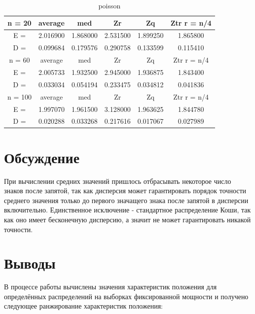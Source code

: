 \documentclass[12pt]{report}
\begin{document}
\begin{table}[H]
\caption{poisson}
\label{tab:my_label5}
\begin{center}
\vspace{5mm}
\begin{tabular}{|c|c|c|c|c|c|}
\hline
n = 20    &average     &med         &Zr          &Zq          &Ztr r = n/4 \\
\hline
E =       &2.016900    &1.868000    &2.531500    &1.899250    &1.865800    \\
\hline
D =       &0.099684    &0.179576    &0.290758    &0.133599    &0.115410    \\
\hline
n = 60    &average     &med         &Zr          &Zq          &Ztr r = n/4 \\
\hline
E =       &2.005733    &1.932500    &2.945000    &1.936875    &1.843400    \\
\hline
D =       &0.033034    &0.054194    &0.233475    &0.034812    &0.041836    \\
\hline
n = 100   &average     &med         &Zr          &Zq          &Ztr r = n/4 \\
\hline
E =       &1.997070    &1.961500    &3.128000    &1.963625    &1.844780    \\
\hline
D =       &0.020288    &0.033268    &0.217616    &0.017067    &0.027989    \\
\hline
\end{tabular}
\end{center}
\end{table}

\section{Обсуждение}

\par При вычислении средних значений пришлось отбрасывать некоторое число знаков после запятой, так как дисперсия может гарантировать порядок точности среднего значения только до первого значащего знака после запятой в дисперсии включительно. Единственное исключение - стандартное распределение Коши, так как оно имеет бесконечную дисперсию, а значит не может гарантировать никакой точности.

\section{Выводы}

\par В процессе работы вычислены значения характеристик положения для определённых распределений на выборках фиксированной мощности и получено следующее ранжирование характеристик положения:
\end{document}
